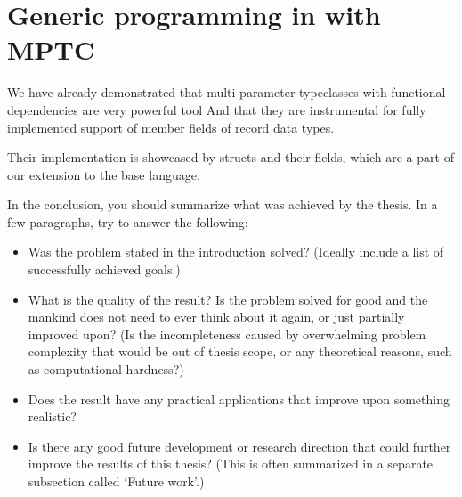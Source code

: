 

\section{Generic programming in \cmm{} with MPTC}

We have already demonstrated  that multi-parameter typeclasses with functional dependencies are very powerful tool And that they are instrumental for fully implemented support of member fields of record data types.

Their implementation is showcased by structs and their fields, which are a part of our extension to the base \cmm{} language.

In the conclusion, you should summarize what was achieved by the thesis. In a few paragraphs, try to answer the following:
\begin{itemize}
\item Was the problem stated in the introduction solved? (Ideally include a list of successfully achieved goals.)
\item What is the quality of the result? Is the problem solved for good and the mankind does not need to ever think about it again, or just partially improved upon? (Is the incompleteness caused by overwhelming problem complexity that would be out of thesis scope, or any theoretical reasons, such as computational hardness?)
\item Does the result have any practical applications that improve upon something realistic?
\item Is there any good future development or research direction that could further improve the results of this thesis? (This is often summarized in a separate subsection called `Future work'.)
\end{itemize}
